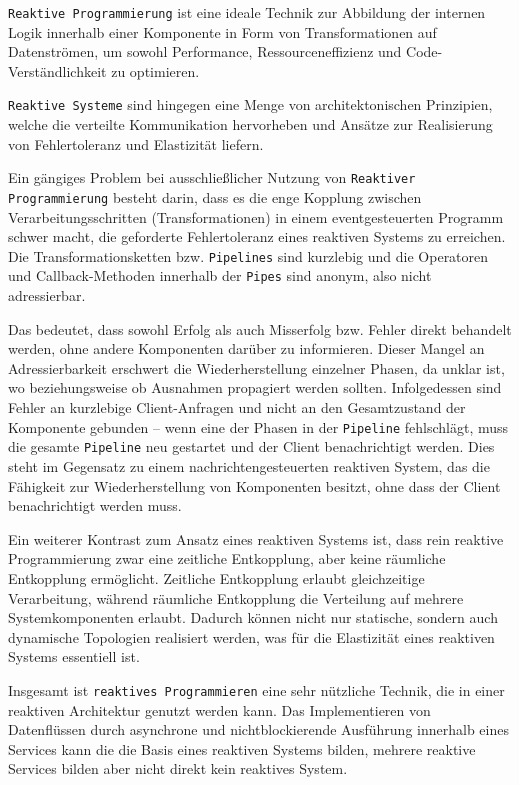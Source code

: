 \verb|Reaktive Programmierung| ist eine ideale Technik zur Abbildung der internen Logik innerhalb einer Komponente in Form von Transformationen
auf Datenströmen, um sowohl Performance, Ressourceneffizienz und Code-Verständlichkeit zu optimieren.

\verb|Reaktive Systeme| sind hingegen eine Menge von architektonischen Prinzipien, welche die verteilte Kommunikation hervorheben und
Ansätze zur Realisierung von Fehlertoleranz und Elastizität liefern.

Ein gängiges Problem bei ausschließlicher Nutzung von \verb|Reaktiver Programmierung| besteht darin, dass es die enge Kopplung
zwischen Verarbeitungsschritten (Transformationen) in einem eventgesteuerten Programm schwer macht, die geforderte Fehlertoleranz
eines reaktiven Systems zu erreichen.
Die Transformationsketten bzw. \verb|Pipelines| sind kurzlebig und die Operatoren und Callback-Methoden innerhalb der \verb|Pipes|
sind anonym, also nicht adressierbar.

Das bedeutet, dass sowohl Erfolg als auch Misserfolg bzw. Fehler direkt behandelt werden, ohne andere Komponenten darüber zu informieren.
Dieser Mangel an Adressierbarkeit erschwert die Wiederherstellung einzelner Phasen, da unklar ist, wo beziehungsweise ob Ausnahmen
propagiert werden sollten. Infolgedessen sind Fehler an kurzlebige Client-Anfragen und nicht an den
Gesamtzustand der Komponente gebunden – wenn eine der Phasen in der \verb|Pipeline| fehlschlägt, muss die gesamte \verb|Pipeline| neu
gestartet und der Client benachrichtigt werden. Dies steht im Gegensatz zu einem nachrichtengesteuerten reaktiven System, das
die Fähigkeit zur Wiederherstellung von Komponenten besitzt, ohne dass der Client benachrichtigt werden muss.

Ein weiterer Kontrast zum Ansatz eines reaktiven Systems ist, dass rein reaktive Programmierung zwar eine zeitliche Entkopplung,
aber keine räumliche Entkopplung ermöglicht. Zeitliche Entkopplung erlaubt gleichzeitige Verarbeitung, während räumliche Entkopplung
die Verteilung auf mehrere Systemkomponenten erlaubt. Dadurch können nicht nur statische, sondern auch dynamische Topologien
realisiert werden, was für die Elastizität eines reaktiven Systems essentiell ist.

Insgesamt ist \verb|reaktives Programmieren| eine sehr nützliche Technik, die in einer reaktiven Architektur genutzt werden kann.
Das Implementieren von Datenflüssen durch asynchrone und nichtblockierende Ausführung innerhalb eines Services kann die
die Basis eines reaktiven Systems bilden, mehrere reaktive Services bilden aber nicht direkt kein reaktives System.

